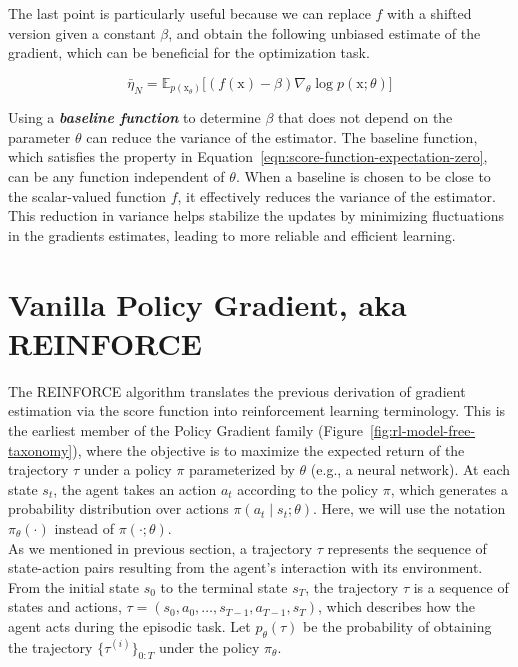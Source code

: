 \noindent The last point is particularly useful because we can replace $f$ with a shifted version given a constant $\beta$, and obtain the following unbiased estimate of the gradient, which can be beneficial for the optimization task.

\begin{equation}\label{eqn:score-function-gradient-estimator-baseline}
\bar{\eta}_{N} = \mathbb{E}_{p(\mathrm{x}_{\theta})}\big[(f(\mathrm{x}) - \beta) \nabla_{\theta} \log p(\mathrm{x}; \theta)\big]
\end{equation}

\noindent Using a \textbf{\textit{baseline function}} to determine $\beta$ that does not depend on the parameter $\theta$ can reduce the variance of the 
estimator. The baseline function, which satisfies the property in Equation~\ref{eqn:score-function-expectation-zero}, can be any function independent of
$\theta$. When a baseline is chosen to be close to the scalar-valued function $f$, it effectively reduces the variance of the estimator. This reduction in variance helps stabilize the updates by minimizing fluctuations in the gradients estimates, leading to more reliable and efficient learning.

\section{Vanilla Policy Gradient, aka REINFORCE}

The REINFORCE algorithm \citep{williams1992simple} translates the previous 
derivation of gradient estimation via the score function into reinforcement learning terminology. This is the earliest member of the Policy Gradient family (Figure~\ref{fig:rl-model-free-taxonomy}), where the objective is to maximize the expected return of the trajectory $\tau$ under a policy $\pi$ parameterized by $\theta$ (e.g., a neural network). At each state $s_{t}$, the agent takes an action $a_{t}$ according to the policy $\pi$, which generates a probability distribution over actions $\pi(a_{t}\mid s_{t};\theta)$. Here, we will use the notation $\pi_{\theta}(\cdot)$ instead of $\pi(\cdot;\theta)$. \\

\noindent As we mentioned in previous section, a trajectory $\tau$ represents the sequence of state-action pairs resulting from the agent's interaction with its environment. From the initial state $s_{0}$ to the terminal state $s_{T}$, the trajectory $\tau$ is a sequence of states and actions, $\tau = (s_{0}, a_{0}, \dots, s_{T-1}, a_{T-1}, s_{T})$, which describes how the agent
acts during the episodic task. Let $p_{\theta}(\tau)$ be the
probability of obtaining the trajectory $\{\tau^{(i)}\}_{0:T}$ under the policy $\pi_{\theta}$. \\

